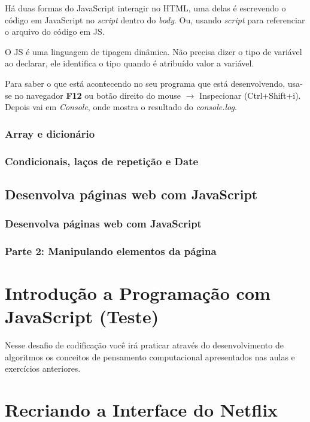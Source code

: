 \documentclass[12pt,a4paper]{article}
\begin{document}
	Há duas formas do JavaScript interagir no HTML, uma delas é escrevendo o código em JavaScript no \textit{script} dentro do \textit{body}. Ou, usando \textit{script} para referenciar o arquivo do código em JS.
	
	O JS é uma linguagem de tipagem dinâmica. Não precisa dizer o tipo de variável ao declarar, ele identifica o tipo quando é atribuído valor a variável.
	
	Para saber o que está acontecendo no seu programa que está desenvolvendo, usa-se no navegador \textbf{F12} ou botão direito do mouse $\rightarrow$ Inspecionar (Ctrl+Shift+i). Depois vai em \textit{Console}, onde mostra o resultado do \textit{console.log}.
	
	\subsubsection{Array e dicionário}
	
	\subsubsection{Condicionais, laços de repetição e Date}
	
	
	\subsection{Desenvolva páginas web com JavaScript}
	\subsubsection{Desenvolva páginas web com JavaScript}
	
	\subsubsection{Parte 2: Manipulando elementos da página}
	
	
	
	\section{Introdução a Programação com JavaScript (Teste)}
	
	Nesse desafio de codificação você irá praticar através do desenvolvimento de algoritmos os conceitos de pensamento computacional apresentados nas aulas e exercícios anteriores.
	
	\section{Recriando a Interface do Netflix}
	
\end{document}
